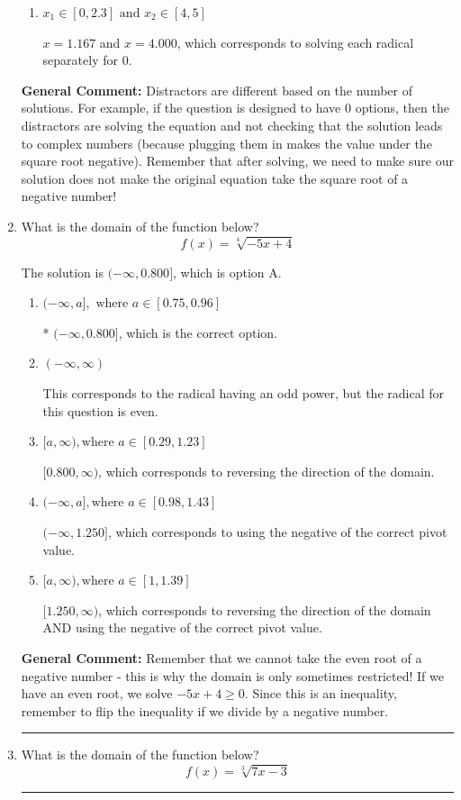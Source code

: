 \documentclass{extbook}[14pt]
\newcommand{\litem}[1]{\item #1

\rule{\textwidth}{0.4pt}}
\begin{document}
\begin{enumerate}
{\begin{enumerate}[label=\Alph*.]
$x = -0.250$ and $x = 4.000$, which corresponds to solving the equation correctly and including the value that makes the first square root 0.
\item \( x_1 \in [0, 2.3] \text{ and } x_2 \in [4,5] \)

$x = 1.167$ and $x = 4.000$, which corresponds to solving each radical separately for 0.
\end{enumerate}

\textbf{General Comment:} Distractors are different based on the number of solutions. For example, if the question is designed to have 0 options, then the distractors are solving the equation and not checking that the solution leads to complex numbers (because plugging them in makes the value under the square root negative). Remember that after solving, we need to make sure our solution does not make the original equation take the square root of a negative number!
}
\litem{
What is the domain of the function below?
\[ f(x) = \sqrt[4]{-5 x + 4} \]

The solution is \( (-\infty, 0.800] \), which is option A.\begin{enumerate}[label=\Alph*.]
\item \( (-\infty, a], \text{ where } a \in [0.75, 0.96] \)

* $(-\infty, 0.800]$, which is the correct option.
\item \( (-\infty, \infty) \)

This corresponds to the radical having an odd power, but the radical for this question is even.
\item \( [a, \infty), \text{where } a \in [0.29, 1.23] \)

 $[0.800, \infty)$, which corresponds to reversing the direction of the domain.
\item \( (-\infty, a], \text{where } a \in [0.98, 1.43] \)

$(-\infty, 1.250]$, which corresponds to using the negative of the correct pivot value.
\item \( [a, \infty), \text{where } a \in [1, 1.39] \)

$[1.250, \infty)$, which corresponds to reversing the direction of the domain AND using the negative of the correct pivot value.
\end{enumerate}

\textbf{General Comment:} Remember that we cannot take the even root of a negative number - this is why the domain is only sometimes restricted! If we have an even root, we solve $-5 x + 4 \geq 0$. Since this is an inequality, remember to flip the inequality if we divide by a negative number.
}
\litem{
What is the domain of the function below?
\[ f(x) = \sqrt[3]{7 x - 3} \]

}
\end{enumerate}
\end{document}
